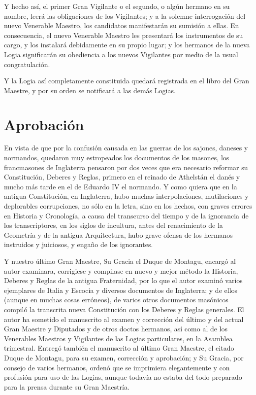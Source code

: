 \documentclass[a4paper,12pt,twoside]{book}
\newcommand{\manuscritosection}[1]{%
\section*{#1}
\addcontentsline{toc}{section}{#1}
}
\begin{document}
Y hecho así, el primer Gran Vigilante o el segundo, o algún hermano en su nombre, leerá las obligaciones de los Vigilantes; y a la solemne interrogación del nuevo Venerable Maestro, los candidatos manifestarán su sumisión a ellas. En consecuencia, el nuevo Venerable Maestro les presentará los instrumentos de su cargo, y los instalará debidamente en su propio lugar; y los hermanos de la nueva Logia significarán su obediencia a los nuevos Vigilantes por medio de la usual congratulación.

Y la Logia así completamente constituida quedará registrada en el libro del Gran Maestre, y por su orden se notificará a las demás Logias.

\manuscritosection{Aprobación}

En vista de que por la confusión causada en las guerras de los sajones, daneses y normandos, quedaron muy estropeados los documentos de los masones, los francmasones de Inglaterra pensaron por dos veces que era necesario reformar su Constitución, Deberes y Reglas, primero en el reinado de Athelstán el danés y mucho más tarde en el de Eduardo IV el normando. Y como quiera que en la antigua Constitución, en Inglaterra, hubo muchas interpolaciones, mutilaciones y deplorables corrupciones, no sólo en la letra, sino en los hechos, con graves errores en Historia y Cronología, a causa del transcurso del tiempo y de la ignorancia de los transcriptores, en los siglos de incultura, antes del renacimiento de la Geometría y de la antigua Arquitectura, hubo grave ofensa de los hermanos instruidos y juiciosos, y engaño de los ignorantes.

Y nuestro último Gran Maestre, Su Gracia el Duque de Montagu, encargó al autor examinara, corrigiese y compilase en nuevo y mejor método la Historia, Deberes y Reglas de la antigua Fraternidad, por lo que el autor examinó varios ejemplares de Italia y Escocia y diversos documentos de Inglaterra; y de ellos (aunque en muchas cosas erróneos), de varios otros documentos masónicos compiló la transcrita nueva Constitución con los Deberes y Reglas generales. El autor ha sometido el manuscrito al examen y corrección del último y del actual Gran Maestre y Diputados y de otros doctos hermanos, así como al de los Venerables Maestros y Vigilantes de las Logias particulares, en la Asamblea trimestral. Entregó también el manuscrito al último Gran Maestre, el citado Duque de Montagu, para su examen, corrección y aprobación; y Su Gracia, por consejo de varios hermanos, ordenó que se imprimiera elegantemente y con profusión para uso de las Logias, aunque todavía no estaba del todo preparado para la prensa durante su Gran Maestría.
\end{document}
